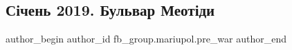  
 
 
 
 

\subsection{Січень 2019. Бульвар Меотіди}
\label{sec:11_02_2023.fb.fb_group.mariupol.pre_war.10.s_chen_2019__bulvar_}

\ifcmt
 author_begin
   author_id fb_group.mariupol.pre_war
 author_end
\fi
